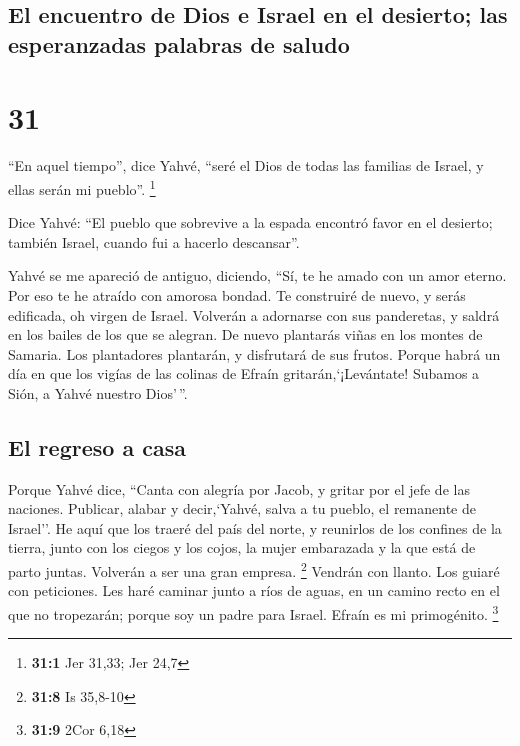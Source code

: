 \hypertarget{el-encuentro-de-dios-e-israel-en-el-desierto-las-esperanzadas-palabras-de-saludo}{%
\subsection{El encuentro de Dios e Israel en el desierto; las
esperanzadas palabras de
saludo}\label{el-encuentro-de-dios-e-israel-en-el-desierto-las-esperanzadas-palabras-de-saludo}}

\hypertarget{section-30}{%
\section{31}\label{section-30}}

 ``En aquel tiempo'', dice Yahvé, ``seré el Dios de todas
las familias de Israel, y ellas serán mi pueblo''. \footnote{\textbf{31:1}
  Jer 31,33; Jer 24,7}

 Dice Yahvé: ``El pueblo que sobrevive a la espada
encontró favor en el desierto; también Israel, cuando fui a hacerlo
descansar''.

 Yahvé se me apareció de antiguo, diciendo, ``Sí, te he
amado con un amor eterno. Por eso te he atraído con amorosa bondad.
 Te construiré de nuevo, y serás edificada, oh virgen de
Israel. Volverán a adornarse con sus panderetas, y saldrá en los bailes
de los que se alegran.  De nuevo plantarás viñas en los
montes de Samaria. Los plantadores plantarán, y disfrutará de sus
frutos.  Porque habrá un día en que los vigías de las
colinas de Efraín gritarán,`¡Levántate! Subamos a Sión, a Yahvé nuestro
Dios'\,''.

\hypertarget{el-regreso-a-casa}{%
\subsection{El regreso a casa}\label{el-regreso-a-casa}}

 Porque Yahvé dice, ``Canta con alegría por Jacob, y
gritar por el jefe de las naciones. Publicar, alabar y decir,`Yahvé,
salva a tu pueblo, el remanente de Israel''.  He aquí que
los traeré del país del norte, y reunirlos de los confines de la tierra,
junto con los ciegos y los cojos, la mujer embarazada y la que está de
parto juntas. Volverán a ser una gran empresa. \footnote{\textbf{31:8}
  Is 35,8-10}  Vendrán con llanto. Los guiaré con
peticiones. Les haré caminar junto a ríos de aguas, en un camino recto
en el que no tropezarán; porque soy un padre para Israel. Efraín es mi
primogénito. \footnote{\textbf{31:9} 2Cor 6,18}

